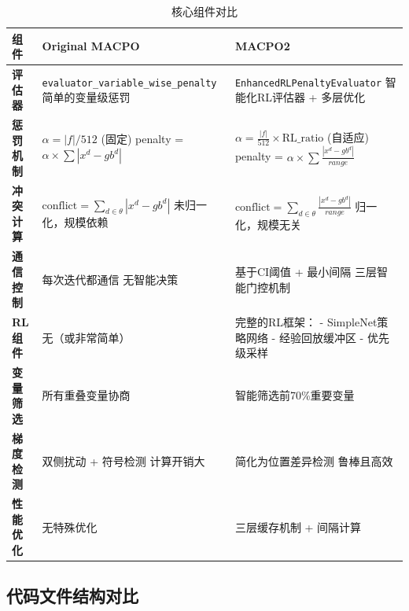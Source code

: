 \documentclass[15pt,a3paper]{ctexart}
\begin{document}
\begin{table}[h]
\centering
\caption{核心组件对比}
\begin{tabular}{|l|p{5.5cm}|p{5.5cm}|}
\hline
\textbf{组件} & \textbf{Original MACPO} & \textbf{MACPO2} \\
\hline
\rowcolor{gray!20}
\textbf{评估器} & 
\texttt{evaluator\_variable\_wise\_penalty} 
\newline 简单的变量级惩罚 & 
\texttt{EnhancedRLPenaltyEvaluator} 
\newline 智能化RL评估器 + 多层优化 \\
\hline
\textbf{惩罚机制} & 
$\alpha = |f| / 512$ (固定)
\newline penalty = $\alpha \times \sum |x^d - gb^d|$ & 
$\alpha = \frac{|f|}{512} \times \text{RL\_ratio}$ (自适应)
\newline penalty = $\alpha \times \sum \frac{|x^d - gb^d|}{range}$ \\
\hline
\rowcolor{gray!20}
\textbf{冲突计算} & 
$\text{conflict} = \sum_{d \in \theta} |x^d - gb^d|$ 
\newline 未归一化，规模依赖 & 
$\text{conflict} = \sum_{d \in \theta} \frac{|x^d - gb^d|}{range}$ 
\newline 归一化，规模无关 \\
\hline
\textbf{通信控制} & 
每次迭代都通信
\newline 无智能决策 & 
基于CI阈值 + 最小间隔
\newline 三层智能门控机制 \\
\hline
\rowcolor{gray!20}
\textbf{RL组件} & 
无（或非常简单） & 
完整的RL框架：
\newline - SimpleNet策略网络
\newline - 经验回放缓冲区
\newline - 优先级采样 \\
\hline
\textbf{变量筛选} & 
所有重叠变量协商 & 
智能筛选前70\%重要变量 \\
\hline
\rowcolor{gray!20}
\textbf{梯度检测} & 
双侧扰动 + 符号检测
\newline 计算开销大 & 
简化为位置差异检测
\newline 鲁棒且高效 \\
\hline
\textbf{性能优化} & 
无特殊优化 & 
三层缓存机制 + 间隔计算 \\
\hline
\end{tabular}
\end{table}

\subsection{代码文件结构对比}
\end{document}
